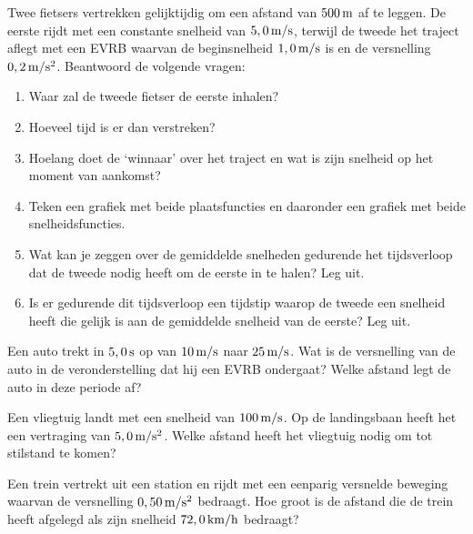 \documentclass{ximera}
\begin{document}
\begin{exercise} Twee fietsers vertrekken gelijktijdig om een afstand van $500\rm\,m$ af te leggen. De eerste rijdt met een constante snelheid van $5,0\rm\,m/s$, terwijl de tweede het traject aflegt met een EVRB waarvan de beginsnelheid $1,0\rm\,m/s$ is en de versnelling $0,2\rm\,m/s^2$. Beantwoord de volgende vragen:
\begin{enumerate}
\item Waar zal de tweede fietser de eerste inhalen? 
\item Hoeveel tijd is er dan verstreken? 
\item Hoelang doet de `winnaar' over het traject en wat is zijn snelheid op het moment van aankomst?
\item Teken een grafiek met beide plaatsfuncties en daaronder een grafiek met beide snelheidsfuncties. 
\item Wat kan je zeggen over de gemiddelde snelheden gedurende het tijdsverloop dat de tweede nodig heeft om de eerste in te halen? Leg uit.
\item Is er gedurende dit tijdsverloop een tijdstip waarop de tweede een snelheid heeft die gelijk is aan de
gemiddelde snelheid van de eerste? Leg uit.
\end{enumerate}

\end{exercise}

\begin{exercise} Een auto trekt in $5,0\rm\,s$ op van $10\rm\,m/s$ naar $25\rm\,m/s$. Wat is de versnelling van de auto in de veronderstelling dat hij een EVRB ondergaat? Welke afstand legt de auto in deze periode af?

\end{exercise}

\begin{exercise} Een vliegtuig landt met een snelheid van $100\rm\,m/s$. Op de landingsbaan heeft het een vertraging van $5,0\rm\,m/s^2$. Welke afstand heeft het vliegtuig nodig om tot stilstand te komen? %

\end{exercise}

\begin{exercise} Een trein vertrekt uit een station en rijdt met een eenparig versnelde beweging waarvan de versnelling $0,50\rm\,m/s^2$ bedraagt. Hoe groot is de afstand die de trein heeft afgelegd als zijn snelheid $72,0\rm\,km/h$ bedraagt?

\end{exercise}
\end{document}
